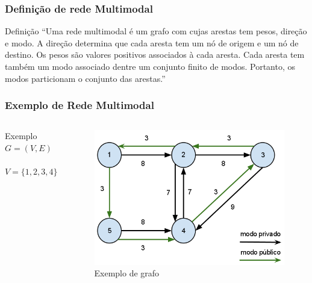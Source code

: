 \frame
{
\frametitle{Definição de rede Multimodal}
\begin{block}{Definição}
``Uma rede multimodal é um grafo com cujas arestas tem pesos, direção e modo. A direção determina que cada aresta tem um nó de origem e um nó de destino.
Os pesos são valores positivos associados à cada aresta. Cada aresta tem também um modo associado dentre um conjunto finito de modos. Portanto, os modos particionam o conjunto das arestas.''
\end{block}
}

\frame
{
\frametitle{Exemplo de Rede Multimodal}
\begin{columns}[c]
\column{1.5in}
	\begin{exampleblock}{Exemplo}
		$G = (V,E)$ \\
		$ $ \\
		$V = \{1,2,3,4\}$ \\
		$ $ \\
	\end{exampleblock}
\column{1.5in}
	\begin{figure}
		\includegraphics[width=\textwidth]{./imgs/multimodal.png}
		\caption{Exemplo de grafo}
	\end{figure}
\end{columns}
}
